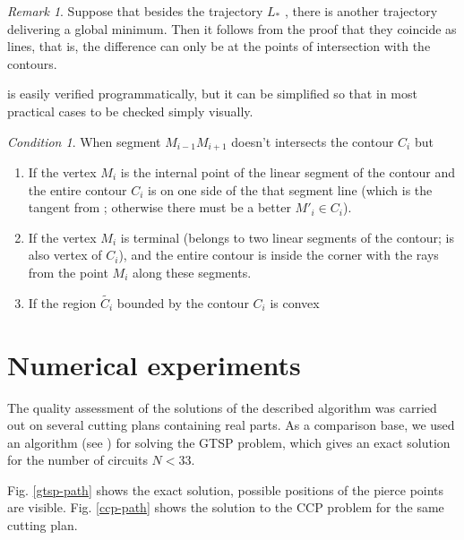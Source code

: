 \documentclass[]{interact}
\theoremstyle{plain}%
\theoremstyle{definition}
\theoremstyle{remark}
\newtheorem{remark}{Remark}
\newtheorem{condition}{Condition}
\begin{document}
\begin{remark}
Suppose that besides the trajectory
$L_*$ ,
there is another trajectory delivering a global minimum.
Then it follows from the proof
that they coincide as lines,
that is,
the difference can only be at
the points of intersection with the contours.
\end{remark}

is easily verified programmatically,
but it can be simplified
so that in most practical cases
to be checked simply visually.

\begin{condition}
When segment
$M_{i-1} M_{i+1}$
doesn't intersects the contour
$C_i$ but
\begin{enumerate}
  \item
  If the vertex
  $M_i$
  is the internal point of the linear segment of the contour
  and the entire contour
  $C_i$
  is on one side of the that segment line
  (which is the tangent from ;
  otherwise there must be a better
  $M'_i\in C_i$).
  \item
  If the vertex
  $M_i$ is terminal
  (belongs to two linear segments of the contour;
  is also vertex of $C_i$),
  and the entire contour is inside
  the corner with the rays from the point
  $M_i$ along these segments.
  \item
  If the region
  $\tilde{C_i}$
  bounded by the contour
  $C_i$ is convex
\end{enumerate}
\end{condition}

\section{Numerical experiments}

The quality assessment of the solutions
of the described algorithm was carried out on several
cutting plans containing real parts.
As a comparison base, we used an algorithm
(see \cite{bi15})
for solving the GTSP problem, which gives an exact solution for the number of circuits
$N <33$.

Fig. \ref{gtsp-path} shows the exact solution,
possible positions of the pierce points are visible.
Fig. \ref{ccp-path} shows the solution to the CCP problem
for the same cutting plan.
\end{document}
